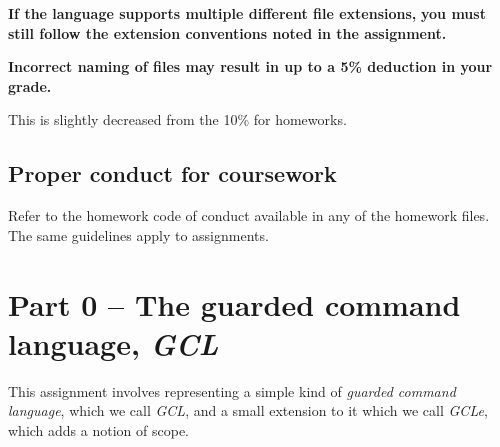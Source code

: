 \documentclass[11pt]{article}
\theoremstyle{definition}
\begin{document}
\begin{center}
\textbf{If the language supports multiple different file extensions,}
\textbf{you must still follow the extension conventions noted in the assignment.}
\end{center}

\begin{center}
\textbf{Incorrect naming of files may result in up to a 5\% deduction in your grade.}
\end{center}
This is slightly decreased from the 10\% for homeworks.

\subsection*{Proper conduct for coursework}
\label{sec:org8e2e65b}
Refer to the homework code of conduct available in any of the homework files.
The same guidelines apply to assignments.

\section*{Part 0 – The guarded command language, \emph{GCL}}
\label{sec:org540ff64}
This assignment involves representing a simple
kind of \emph{guarded command language}, which we call \emph{GCL},
and a small extension to it which we call \emph{GCLe},
which adds a notion of scope.
\end{document}
